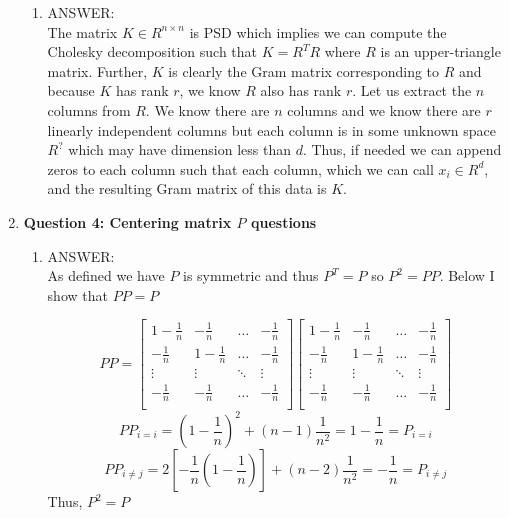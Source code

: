 \documentclass[a4paper, 12pt]{article}
\begin{document}
\begin{enumerate}
\begin{enumerate}
	\item ANSWER:
	\\
	The matrix $K \in R^{n \times n}$ is PSD which implies we can compute the Cholesky decomposition such that $K = R^TR$ where $R$ is an upper-triangle matrix. Further, $K$ is clearly the Gram matrix corresponding to $R$ and because $K$ has rank $r$, we know $R$ also has rank $r$. Let us extract the $n$ columns from $R$. We know there are $n$ columns and we know there are $r$ linearly independent columns but each column is in some unknown space $R^?$ which may have dimension less than $d$. Thus, if needed we can append zeros to each column such that each column, which we can call $x_i \in R^d$, and the resulting Gram matrix of this data is $K$.
	\end{enumerate}

\item \textbf{Question 4: Centering matrix $P$ questions}

	\begin{enumerate}
	\item ANSWER: 
	\\
	As defined we have $P$ is symmetric and thus $P^T = P$ so $P^2 = P P$. Below I show that $PP = P$

	$$PP =  \left[ \begin{array}{cccc}  1-\frac{1}{n} & -\frac{1}{n} & \dots & -\frac{1}{n} \\
							   -\frac{1}{n} & 1-\frac{1}{n} & \dots & -\frac{1}{n} \\
							    \vdots           & \vdots           & \ddots & \vdots \\
							  -\frac{1}{n}  & -\frac{1}{n}  & \dots & -\frac{1}{n} \\	
								   \end{array}\right]     
\left[ \begin{array}{cccc}  1-\frac{1}{n} & -\frac{1}{n} & \dots & -\frac{1}{n} \\
							   -\frac{1}{n} & 1-\frac{1}{n} & \dots & -\frac{1}{n} \\
							    \vdots           & \vdots           & \ddots & \vdots \\
							  -\frac{1}{n}  & -\frac{1}{n}  & \dots & -\frac{1}{n} \\	
								   \end{array}\right]  $$
$$PP_{i = i} = (1-\frac{1}{n})^2 + (n-1)\frac{1}{n^2} = 1 - \frac{1}{n} = P_{i=i}$$
$$PP_{i \ne j} = 2[-\frac{1}{n} (1- \frac{1}{n})]  +  (n-2) \frac{1}{n^2} = -\frac{1}{n} = P_{i \ne j}$$
Thus, $P^2 = P$


\end{enumerate}
\end{enumerate}
\end{document}
